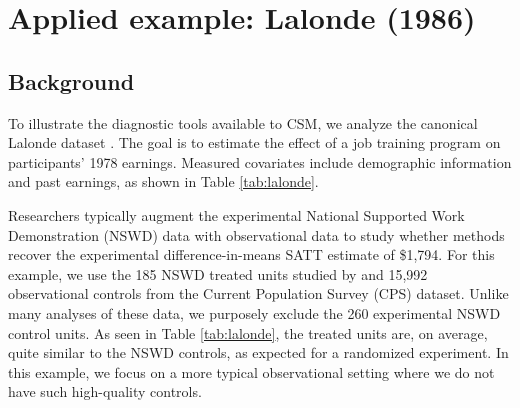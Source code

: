 \documentclass{article}
\begin{document}



\section{Applied example: Lalonde (1986)}
\label{sec:lalonde}

\subsection{Background}

To illustrate the diagnostic tools available to CSM, we analyze the canonical Lalonde dataset \citep{lalonde1986evaluating}.
The goal is to estimate the effect of a job training program on participants' 1978 earnings.
Measured covariates include demographic information and past earnings, as shown in Table \ref{tab:lalonde}.

Researchers typically augment the experimental National Supported Work Demonstration (NSWD) data with observational data to study whether methods recover the experimental difference-in-means SATT estimate of \$1,794.
For this example, we use the 185 NSWD treated units studied by \citet{dehejia1999causal} and 15,992 observational controls from the Current Population Survey (CPS) dataset.
Unlike many analyses of these data, we purposely exclude the 260 experimental NSWD control units.
As seen in Table \ref{tab:lalonde}, the treated units are, on average, quite similar to the NSWD controls, as expected for a randomized experiment.
In this example, we focus on a more typical observational setting where we do not have such high-quality controls.
\end{document}
